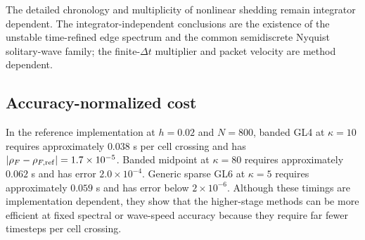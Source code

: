 The detailed chronology and multiplicity of nonlinear shedding remain
integrator dependent.  The integrator-independent conclusions are the
existence of the unstable time-refined edge spectrum and the common
semidiscrete Nyquist solitary-wave family; the finite-$\Delta t$ multiplier and
packet velocity are method dependent.

\subsection{Accuracy-normalized cost}

In the reference implementation at $h=0.02$ and $N=800$, banded GL4 at
$\kappa=10$ requires approximately $0.038$ s per cell crossing and has
$|\rho_F-\rho_{F,\rm ref}|=1.7\times10^{-5}$.  Banded midpoint at
$\kappa=80$ requires approximately $0.062$ s and has error
$2.0\times10^{-4}$.  Generic sparse GL6 at $\kappa=5$ requires
approximately $0.059$ s and has error below $2\times10^{-6}$.  Although these timings are implementation dependent, they
show that the higher-stage methods can be more efficient at fixed spectral or
wave-speed accuracy because they require far fewer timesteps per cell crossing.
